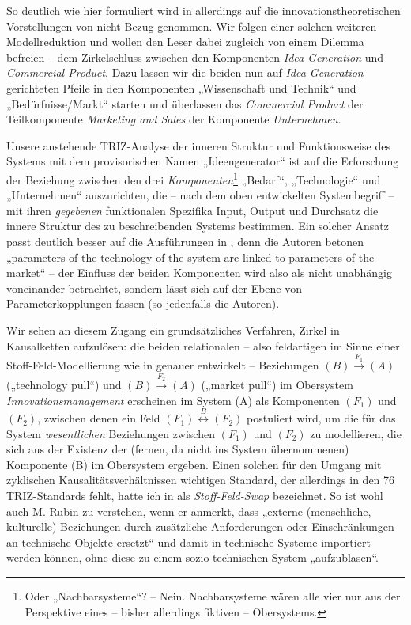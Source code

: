 \documentclass[11pt,a4paper]{article}
\begin{document}
So deutlich wie hier formuliert wird in \cite{TESE2018} allerdings auf die
innovationstheoretischen Vorstellungen von \cite{Preez2006} nicht Bezug
genommen.  Wir folgen einer solchen weiteren Modellreduktion und wollen den
Leser dabei zugleich von einem Dilemma befreien -- dem Zirkelschluss zwischen
den Komponenten \emph{Idea Generation} und \emph{Commercial Product}.  Dazu
lassen wir die beiden nun auf \emph{Idea Generation} gerichteten Pfeile in den
Komponenten „Wissenschaft und Technik“ und „Bedürfnisse/Markt“ starten und
überlassen das \emph{Commercial Product} der Teilkomponente \emph{Marketing
  and Sales} der Komponente \emph{Unternehmen}.

Unsere anstehende TRIZ-Analyse der inneren Struktur und Funktionsweise des
Systems mit dem provisorischen Namen „Ideengenerator“ ist auf die Erforschung
der Beziehung zwischen den drei \emph{Komponenten}\footnote{Oder
  „Nachbarsysteme“?  -- Nein. Nachbarsysteme wären alle vier nur aus der
  Perspektive eines -- bisher allerdings fiktiven -- Obersystems.} „Bedarf“,
„Technologie“ und „Unternehmen“ auszurichten, die -- nach dem oben
entwickelten Systembegriff -- mit ihren \emph{gegebenen} funktionalen
Spezifika Input, Output und Durchsatz die innere Struktur des zu
beschreibenden Systems bestimmen.  Ein solcher Ansatz passt deutlich besser
auf die Ausführungen in \cite[Kap. 1]{TESE2018}, denn die Autoren betonen
„parameters of the technology of the system are linked to parameters of the
market“ -- der Einfluss der beiden Komponenten wird also als nicht unabhängig
voneinander betrachtet, sondern lässt sich auf der Ebene von
Parameterkopplungen fassen (so jedenfalls die Autoren).

Wir sehen an diesem Zugang ein grundsätzliches Verfahren, Zirkel in
Kausalketten aufzulösen: die beiden relationalen -- also feldartigen im Sinne
einer Stoff-Feld-Modellierung wie in \cite[Kap. 4.9]{KS2017} genauer
entwickelt -- Beziehungen $(B)\stackrel{F_1}{\longrightarrow} (A)$
(„technology pull“) und $(B) \stackrel{F_2}{\longrightarrow} (A)$ („market
pull“) im Obersystem \emph{Innovationsmanagement} erscheinen im System (A) als
Komponenten $(F_1)$ und $(F_2)$, zwischen denen ein Feld
$(F_1)\stackrel{B}{\longleftrightarrow}(F_2)$ postuliert wird, um die für das
System \emph{wesentlichen} Beziehungen zwischen $(F_1)$ und $(F_2)$ zu
modellieren, die sich aus der Existenz der (fernen, da nicht ins System
übernommenen) Komponente (B) im Obersystem ergeben.  Einen solchen für den
Umgang mit zyklischen Kausalitätsverhältnissen wichtigen Standard, der
allerdings in den 76 TRIZ-Standards fehlt, hatte ich in \cite{Graebe2019a} als
\emph{Stoff-Feld-Swap} bezeichnet.  So ist wohl auch M. Rubin zu verstehen,
wenn er anmerkt, dass „externe (menschliche, kulturelle) Beziehungen durch
zusätzliche Anforderungen oder Einschränkungen an technische Objekte ersetzt“
und damit in technische Systeme importiert werden können, ohne diese zu einem
sozio-technischen System „aufzublasen“.
\end{document}

